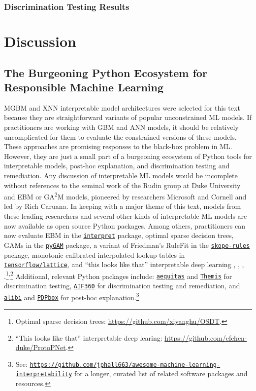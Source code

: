 \documentclass[information,article,submit,moreauthors,pdftex]{definitions/mdpi}
\begin{document}
\subsubsection{Discrimination Testing Results}

\section{Discussion}\label{sec:disc}

\subsection{The Burgeoning Python Ecosystem for Responsible Machine Learning}

MGBM and XNN interpretable model architectures were selected for this text because they are straightforward variants of popular unconstrained ML models. If practitioners are working with GBM and ANN models, it should be relatively uncomplicated for them to evaluate the constrained versions of these models. These approaches are promising responses to the black-box problem in ML. However, they are just a small part of a burgeoning ecosystem of Python tools for interpretable models, post-hoc explanation, and discrimination testing and remediation. Any discussion of interpretable ML models would be incomplete without references to the seminal work of the Rudin group at Duke University and EBM or GA\textsuperscript{2}M models, pioneered by researchers Microsoft and Cornell and led by Rich Caruana. In keeping with a major theme of this text, models from these leading researchers and several other kinds of interpretable ML models are now available as open source Python packages. Among others, practitioners can now evaluate EBM in the \href{https://github.com/interpretml/interpret}{\texttt{interpret}} package, optimal sparse decision trees, GAMs in the \href{https://github.com/dswah/pyGAM}{\texttt{pyGAM}} package, a variant of Friedman's RuleFit  in the \href{https://github.com/scikit-learn-contrib/skope-rules}{\texttt{skope-rules}} package, monotonic calibrated interpolated lookup tables in \href{https://github.com/tensorflow/lattice}{\texttt{tensorflow/lattice}}, and ``this looks like that'' interpretable deep learning \cite{osdt}, \cite{rulefit}, \cite{lattice}, \cite{this_looks_like_that}.\footnote{Optimal sparse decision trees: \url{https://github.com/xiyanghu/OSDT}.}\textsuperscript{,}\footnote{``This looks like that'' interpretable deep learing: \url{https://github.com/cfchen-duke/ProtoPNet}.} Additional, relevant Python packages include: \href{https://github.com/dssg/aequitas}{\texttt{aequitas}} and \href{https://github.com/LASER-UMASS/Themis}{\texttt{Themis}} for discrimination testing, \href{http://aif360.mybluemix.net/}{\texttt{AIF360}} for discrimination testing and remediation, and \href{https://github.com/SeldonIO/alibi}{\texttt{alibi}} and \href{https://github.com/SauceCat/PDPbox}{\texttt{PDPbox}} for post-hoc explanation.\footnote{See: \texttt{\url{https://github.com/jphall663/awesome-machine-learning-interpretability}} for a longer, curated list of related software packages and resources.}
\end{document}
